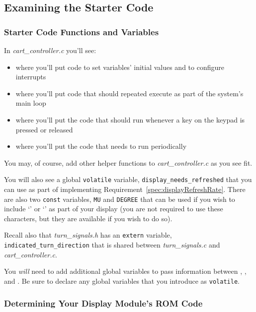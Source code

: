 \subsection{Examining the Starter Code}

\subsubsection{Starter Code Functions and Variables}

In \textit{cart\_controller.c} you'll see:
\begin{itemize}
    \item {} where you'll put code to set variables' initial values and to configure interrupts
    \item {} where you'll put code that should repeated execute as part of the system's main loop
    \item {} where you'll put the code that should run whenever a key on the keypad is pressed or released
    \item {} where you'll put the code that needs to run periodically
\end{itemize}

You may, of course, add other helper functions to \textit{cart\_controller.c} as you see fit.

You will also see a global \lstinline{volatile} variable, \lstinline{display_needs_refreshed} that you can use as part of implementing Requirement~\ref{spec:displayRefreshRate}.
There are also two \lstinline{const} variables, \lstinline{MU} and \lstinline{DEGREE} that can be used if you wish to include `\textmu' or `\textdegree' as part of your display (you are  not required to use these characters, but they are available if you wish to do so).

Recall also that \textit{turn\_signals.h} has an \lstinline{extern} variable, \lstinline{indicated_turn_direction} that is shared between \textit{turn\_signals.c} and \textit{cart\_controller.c}.

You \textit{will} need to add additional global variables to pass information between , , and .
Be sure to declare any global variables that you introduce as \lstinline{volatile}.

\subsubsection{Determining Your Display Module's ROM Code}

